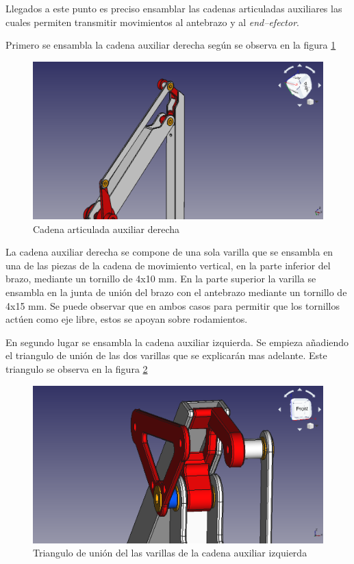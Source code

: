 Llegados a este punto es preciso ensamblar las cadenas articuladas auxiliares las cuales permiten transmitir movimientos al antebrazo y al \textit{end--efector}.

Primero se ensambla la cadena auxiliar derecha según se observa en la figura \ref{fig:auxiliar_derecha}

\begin{figure}[H]
    \centering 
    \includegraphics[width=1\linewidth]{pictures/CadenaArticuladaDerecha.png}
    \caption{Cadena articulada auxiliar derecha}
    \label{fig:auxiliar_derecha}
\end{figure}

La cadena auxiliar derecha se compone de una sola varilla que se ensambla en una de las piezas de la cadena de movimiento vertical, en la parte inferior del brazo, mediante un tornillo de 4x10 mm. En la parte superior la varilla se ensambla en la junta de unión del brazo con el antebrazo mediante un tornillo de 4x15 mm. Se puede observar que en ambos casos para permitir que los tornillos actúen como eje libre, estos se apoyan sobre rodamientos.

En segundo lugar se ensambla la cadena auxiliar izquierda. Se empieza añadiendo el triangulo de unión de las dos varillas que se explicarán mas adelante. Este triangulo se observa en la figura \ref{fig:triangulo_union_varillas}

\begin{figure}[H]
    \centering 
    \includegraphics[width=1\linewidth]{pictures/TrianguloDeUnion.png}
    \caption{Triangulo de unión del las varillas de la cadena auxiliar izquierda}
    \label{fig:triangulo_union_varillas}
\end{figure}

